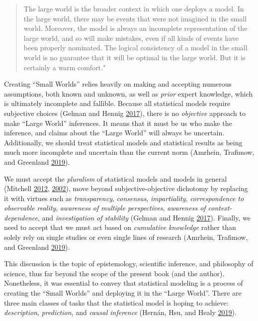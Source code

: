 \documentclass[
]{book}
\begin{document}
\begin{quote}
The large world is the broader context in which one deploys a model. In the large world, there may be events that were not imagined in the small world. Moreover, the model is always an incomplete representation of the large world, and so will make mistakes, even if all kinds of events have been properly nominated. The logical consistency of a model in the small world is no guarantee that it will be optimal in the large world. But it is certainly a warm comfort."
\end{quote}

Creating ``Small Worlds'' relies heavily on making and accepting numerous assumptions, both known and unknown, as well as \emph{prior} expert knowledge, which is ultimately incomplete and fallible. Because all statistical models require subjective choices (Gelman and Hennig \protect\hyperlink{ref-gelmanSubjectiveObjectiveStatistics2017}{2017}), there is no \emph{objective} approach to make ``Large World'' inferences. It means that it must be us who make the inference, and claims about the ``Large World'' will always be uncertain. Additionally, we should treat statistical models and statistical results as being much more incomplete and uncertain than the current norm (Amrhein, Trafimow, and Greenland \protect\hyperlink{ref-amrheinInferentialStatisticsDescriptive2019}{2019}).

We must accept the \emph{pluralism} of statistical models and models in general (Mitchell \protect\hyperlink{ref-mitchellUnsimpleTruthsScience2012}{2012}, \protect\hyperlink{ref-mitchellIntegrativePluralism2002}{2002}), move beyond subjective-objective dichotomy by replacing it with virtues such as \emph{transparency}, \emph{consensus}, \emph{impartiality}, \emph{correspondence to observable reality}, \emph{awareness of multiple perspectives}, \emph{awareness of context-dependence}, and \emph{investigation of stability} (Gelman and Hennig \protect\hyperlink{ref-gelmanSubjectiveObjectiveStatistics2017}{2017}). Finally, we need to accept that we must act based on \emph{cumulative knowledge} rather than solely rely on single studies or even single lines of research (Amrhein, Trafimow, and Greenland \protect\hyperlink{ref-amrheinInferentialStatisticsDescriptive2019}{2019}).

This discussion is the topic of epistemology, scientific inference, and philosophy of science, thus far beyond the scope of the present book (and the author). Nonetheless, it was essential to convey that statistical modeling is a process of creating the ``Small Worlds'' and deploying it in the ``Large World''. There are three main classes of tasks that the statistical model is hoping to achieve: \emph{description}, \emph{prediction}, and \emph{causal inference} (Hernán, Hsu, and Healy \protect\hyperlink{ref-hernanSecondChanceGet2019}{2019}).
\end{document}
